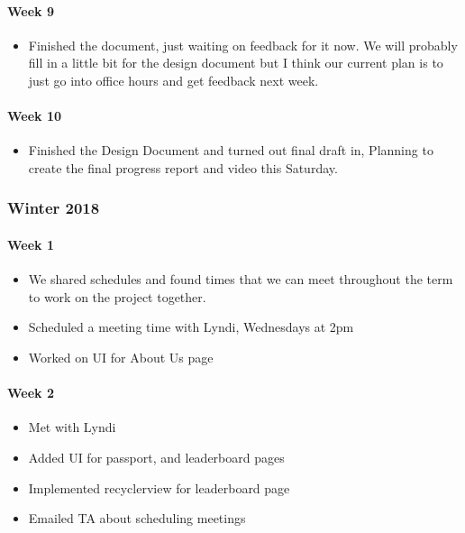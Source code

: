 \documentclass[onecolumn, draftclsnofoot,10pt, compsoc]{IEEEtran}
\begin{document}
      \paragraph{Week 9}
        \begin{itemize}
          \item Finished the document, just waiting on feedback for it now. We will probably fill in a little bit for the design document but I think our current plan is to just go into office hours and get feedback next week.
        \end{itemize}

      \paragraph{Week 10}
        \begin{itemize}
          \item Finished the Design Document and turned out final draft in, Planning to create the final progress report and video this Saturday.
        \end{itemize}

    \subsubsection{Winter 2018}
      \paragraph{Week 1}
        \begin{itemize}
          \item We shared schedules and found times that we can meet throughout the term to work on the project together.
          \item Scheduled a meeting time with Lyndi, Wednesdays at 2pm
          \item Worked on UI for About Us page
        \end{itemize}

      \paragraph{Week 2}
        \begin{itemize}
          \item Met with Lyndi
          \item Added UI for passport, and leaderboard pages
          \item Implemented recyclerview for leaderboard page
          \item Emailed TA about scheduling meetings
        \end{itemize}
\end{document}
